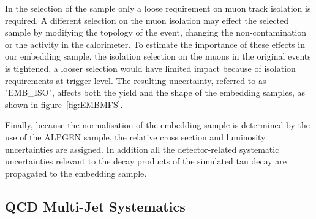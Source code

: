 %
%	
%

In the selection of the \Zmumu sample only a loose requirement on muon track isolation is required.
A different selection on the muon isolation may effect the selected sample by modifying the topology of the event, 
changing the non-\Zmumu contamination or the activity in the calorimeter. 
To estimate  the importance of these effects in our
embedding sample, the isolation selection on the muons in the original \Zmumu events is tightened,
a looser selection would have limited impact because of isolation requirements at trigger level.
The resulting uncertainty, referred to as "EMB\_ISO", affects both the yield and the \mmc shape of 
the embedding samples, as shown in figure~\ref{fig:EMBMFS}. 

Finally, because the normalisation of the embedding sample is determined by the use of the ALPGEN sample, 
the relative cross section and luminosity uncertainties are assigned. In addition
all the detector-related systematic uncertainties relevant to the decay products of the simulated tau 
decay are propagated to the embedding sample.
 

\subsection{QCD Multi-Jet Systematics}\label{sec:qcdsys}

